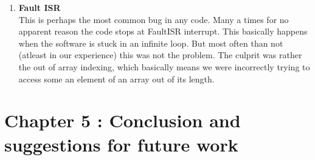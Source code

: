 \documentclass{article}
\begin{document}
\begin{enumerate}
\item \textbf{Fault ISR}\\
  This is perhaps the most common bug in any code. Many a times for no apparent reason the code stops at FaultISR interrupt. This basically happens when the software is stuck in an infinite loop. But most often than not (atleast in our experience) this was not the problem. The culprit was rather the out of array indexing, which basically means we were incorrectly trying to access some an element of an array out of its length. 
\end{enumerate}

\section{Chapter 5 : Conclusion and suggestions for future work}
\end{document}
